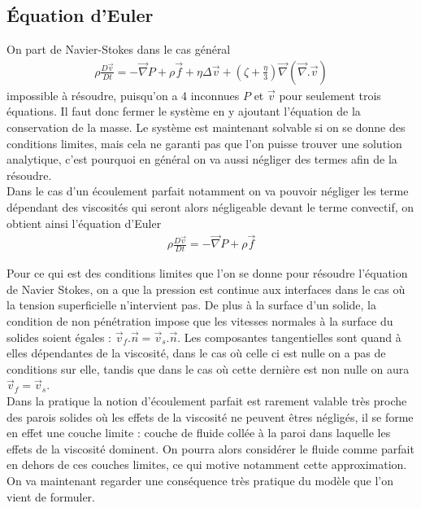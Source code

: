 \documentclass[12pt,prb,aps,epsf]{article}
\begin{document}
\subsection{Équation d'Euler}
On part de Navier-Stokes dans le cas général 
\begin{eqnarray}
\rho \frac{D\vec{v}}{Dt} = -\vec{\nabla} P + \rho \vec{f}+ \eta \Delta \vec{v} + \left(\zeta + \frac{\eta}{3}\right)\vec{\nabla}(\vec{\nabla}.\vec{v})
\end{eqnarray}
impossible à résoudre, puisqu'on a 4 inconnues $P$ et $\vec{v}$ pour seulement trois équations. Il faut donc fermer le système en y ajoutant l'équation de la conservation de la masse. Le système est maintenant solvable si on se donne des conditions limites, mais cela ne garanti pas que l'on puisse trouver une solution analytique, c'est pourquoi en général on va aussi négliger des termes afin de la résoudre.\\
Dans le cas d'un écoulement parfait notamment on va pouvoir négliger les terme dépendant des viscosités  qui seront alors négligeable devant le terme convectif, on obtient ainsi l'équation d'Euler
\begin{eqnarray}
\rho \frac{D\vec{v}}{Dt} = -\vec{\nabla} P + \rho \vec{f}
\end{eqnarray}

Pour ce qui est des conditions limites que l'on se donne pour résoudre l'équation de Navier Stokes, on a que la pression est continue aux interfaces dans le cas où la tension superficielle n'intervient pas. De plus à la surface d'un solide, la condition de non pénétration impose que les vitesses normales à la surface du solides soient égales : $\vec{v}_f.\vec{n} = \vec{v}_s.\vec{n}$. Les composantes tangentielles sont quand à elles dépendantes de la viscosité, dans le cas où celle ci est nulle on a pas de conditions sur elle, tandis que dans le cas où cette dernière est non nulle on aura $\vec{v}_f = \vec{v}_s$.\\

Dans la pratique la notion d'écoulement parfait est rarement valable très proche des parois solides où les effets de la viscosité ne peuvent êtres négligés, il se forme en effet une couche limite : couche de fluide collée à la paroi dans laquelle  les effets de la viscosité dominent. On pourra alors considérer le fluide comme parfait en dehors de ces couches limites, ce qui motive notamment cette approximation.\\

On va maintenant regarder une conséquence très pratique du modèle que l'on vient de formuler.
\end{document}
